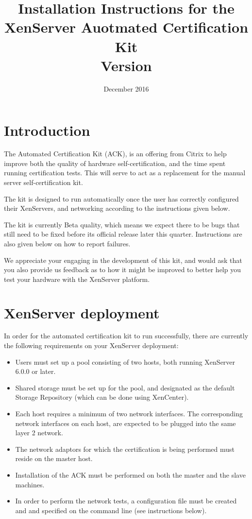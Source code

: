 \documentclass[a4paper,11pt]{article}
\title{Installation Instructions for the XenServer Auotmated Certification Kit\\\normalsize Version \versionnumber}
\date{December 2016}
\begin{document}
\maketitle

\section{Introduction}
The Automated Certification Kit (ACK), is an offering from Citrix to help improve both the quality of hardware self-certification, and the time spent running certification tests. This will serve to act as a replacement for the manual server self-certification kit.

The kit is designed to run automatically once the user has correctly configured their XenServers, and networking according to the instructions given below. 

The kit is currently Beta quality, which means we expect there to be bugs that still need to be fixed before its official release later this quarter. Instructions are also given below on how to report failures. 

We appreciate your engaging in the development of this kit, and would ask that you also provide us feedback as to how it might be improved to better help you test your hardware with the XenServer platform.

\section{XenServer deployment}
In order for the automated certification kit to run successfully, there are currently the following requirements on your XenServer deployment:
\begin{itemize}
\item Users must set up a pool consisting of two hosts, both running XenServer 6.0.0 or later.
\item Shared storage must be set up for the pool, and designated as the default Storage Repository (which can be done using XenCenter).
\item Each host requires a minimum of two network interfaces. The corresponding network interfaces on each host, are expected to be plugged into the same layer 2 network.
\item The network adaptors for which the certification is being performed must reside on the master host.
\item Installation of the ACK must be performed on both the master and the slave machines.
\item In order to perform the network tests, a configuration file must be created and and specified on the command line (see instructions below).
\end{itemize}
\end{document}
